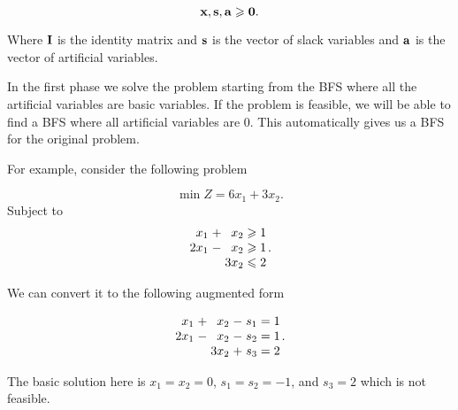 \documentclass{report}
\begin{document}
\[
	\vb{x}, \vb{s}, \vb{a} \geqslant \vb{0}
	.\]

Where $\vb{I}$ is the identity matrix and $\vb{s}$ is the vector of slack variables and $\vb{a}$ is the vector of artificial variables.

In the first phase we solve the problem starting from the BFS where all the artificial variables are basic variables. If the problem is feasible, we will be able to find a BFS where all artificial variables are 0. This automatically gives us a BFS for the original problem.

For example, consider the following problem

\[
	\min Z = 6x_1 + 3x_2
	.\]
Subject to
\[
	\arraycolsep=1.4pt
	\begin{array}{rrrrr}
		x_1  & + & x_2  & \geq & 1 \\
		2x_1 & - & x_2  & \geq & 1 \\
		     &   & 3x_2 & \leq & 2
	\end{array}
	.\]

We can convert it to the following augmented form

\[
	\arraycolsep=1.4pt
	\begin{array}{rrrrrrrr}
		x_1  & + & x_2  & - & s_1 & = & 1 \\
		2x_1 & - & x_2  & - & s_2 & = & 1 \\
		     &   & 3x_2 & + & s_3 & = & 2
	\end{array}
	.\]

The basic solution here is $x_1 = x_2 = 0$, $s_1 = s_2 = -1$, and $s_3 = 2$ which is not feasible.
\end{document}
